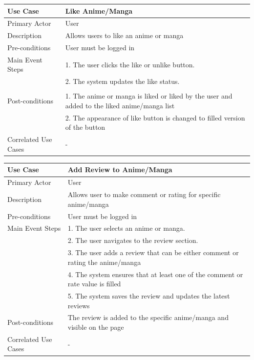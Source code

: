 \begin{longtable}{|p{}|p{}|}
    \hline
    \rowcolor{lightblue}
    \textbf{Use Case} & \textbf{Like Anime/Manga} \\
    \hline
    Primary Actor & User\\
    \hline
    Description &Allows users to like an anime or manga\\
    \hline
    Pre-conditions &User must be logged in \\
    \hline
    Main Event Steps & 1. The user clicks the like or unlike button. \\
    & 2. The system updates the like status. \\\\
    \hline
    Post-conditions &1. The anime or manga is liked or liked by the user and added to the liked anime/manga list\\
    &2. The appearance of like button is changed to filled version of the button\\
    \hline
    Correlated Use Cases &- \\
    \hline
\end{longtable}


\begin{longtable}{|p{}|p{}|}
    \hline
    \rowcolor{lightblue}
    \textbf{Use Case} & \textbf{Add Review to Anime/Manga} \\
    \hline
    Primary Actor & User\\
    \hline
    Description &Allows user to make comment or rating for specific anime/manga\\
    \hline
    Pre-conditions & User must be logged in\\
    \hline
    Main Event Steps &  1. The user selects an anime or manga. \\
    & 2. The user navigates to the review section. \\
    & 3. The user adds a review that can be either comment or rating the anime/manga\\
    & 4. The system ensures that at least one of the comment or rate value is filled\\
    & 5. The system saves the review and updates the latest reviews \\
    \hline
    Post-conditions & The review is added to the specific anime/manga and visible on the page\\
    \hline
    Correlated Use Cases & - \\
    \hline
\end{longtable}

